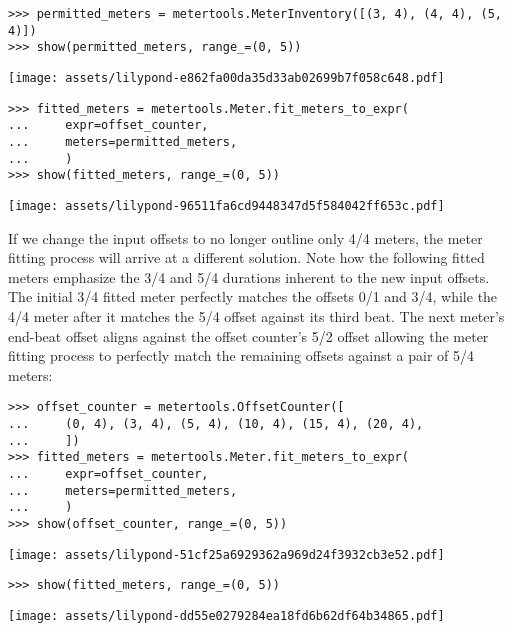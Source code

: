 \begin{singlespacing}
\vspace{-0.5\baselineskip}
\begin{lstlisting}
>>> permitted_meters = metertools.MeterInventory([(3, 4), (4, 4), (5, 4)])
>>> show(permitted_meters, range_=(0, 5))
\end{lstlisting}
\noindent\texttt{[image: assets/lilypond-e862fa00da35d33ab02699b7f058c648.pdf]}
\begin{lstlisting}
>>> fitted_meters = metertools.Meter.fit_meters_to_expr(
...     expr=offset_counter,
...     meters=permitted_meters,
...     )
>>> show(fitted_meters, range_=(0, 5))
\end{lstlisting}
\noindent\texttt{[image: assets/lilypond-96511fa6cd9448347d5f584042ff653c.pdf]}
\end{singlespacing}

\noindent If we change the input offsets to no longer outline only 4/4 meters,
the meter fitting process will arrive at a different solution. Note how the
following fitted meters emphasize the 3/4 and 5/4 durations inherent to the new
input offsets. The initial 3/4 fitted meter perfectly matches the offsets 0/1
and 3/4, while the 4/4 meter after it matches the 5/4 offset against its
third beat. The next meter's end-beat offset aligns against the offset
counter's 5/2 offset allowing the meter fitting process to perfectly match the
remaining offsets against a pair of 5/4 meters:

\begin{comment}
<abjad>
offset_counter = metertools.OffsetCounter([
    (0, 4), (3, 4), (5, 4), (10, 4), (15, 4), (20, 4),
    ])
fitted_meters = metertools.Meter.fit_meters_to_expr(
    expr=offset_counter,
    meters=permitted_meters,
    )
show(offset_counter, range_=(0, 5))
show(fitted_meters, range_=(0, 5))
</abjad>
\end{comment}

\begin{singlespacing}
\vspace{-0.5\baselineskip}
\begin{lstlisting}
>>> offset_counter = metertools.OffsetCounter([
...     (0, 4), (3, 4), (5, 4), (10, 4), (15, 4), (20, 4),
...     ])
>>> fitted_meters = metertools.Meter.fit_meters_to_expr(
...     expr=offset_counter,
...     meters=permitted_meters,
...     )
>>> show(offset_counter, range_=(0, 5))
\end{lstlisting}
\noindent\texttt{[image: assets/lilypond-51cf25a6929362a969d24f3932cb3e52.pdf]}
\begin{lstlisting}
>>> show(fitted_meters, range_=(0, 5))
\end{lstlisting}
\noindent\texttt{[image: assets/lilypond-dd55e0279284ea18fd6b62df64b34865.pdf]}
\end{singlespacing}

